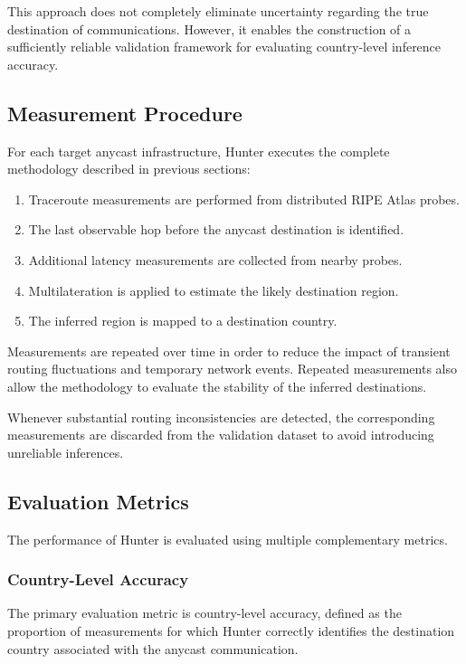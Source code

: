 This approach does not completely eliminate uncertainty regarding the true destination of communications. However, it enables the construction of a sufficiently reliable validation framework for evaluating country-level inference accuracy.

\subsection{Measurement Procedure}

For each target anycast infrastructure, Hunter executes the complete methodology described in previous sections:

\begin{enumerate}
    \item Traceroute measurements are performed from distributed RIPE Atlas probes.
    \item The last observable hop before the anycast destination is identified.
    \item Additional latency measurements are collected from nearby probes.
    \item Multilateration is applied to estimate the likely destination region.
    \item The inferred region is mapped to a destination country.
\end{enumerate}

Measurements are repeated over time in order to reduce the impact of transient routing fluctuations and temporary network events. Repeated measurements also allow the methodology to evaluate the stability of the inferred destinations.

Whenever substantial routing inconsistencies are detected, the corresponding measurements are discarded from the validation dataset to avoid introducing unreliable inferences.

\subsection{Evaluation Metrics}

The performance of Hunter is evaluated using multiple complementary metrics.

\subsubsection{Country-Level Accuracy}

The primary evaluation metric is country-level accuracy, defined as the proportion of measurements for which Hunter correctly identifies the destination country associated with the anycast communication.

